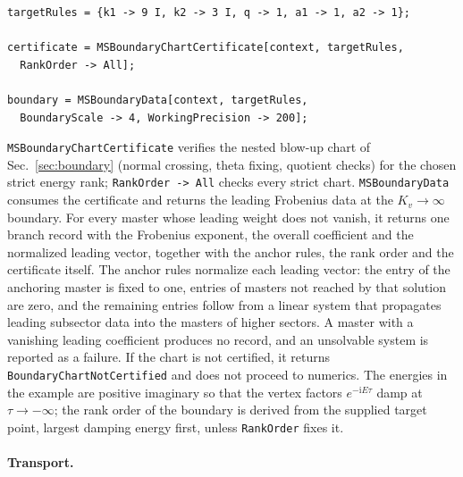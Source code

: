 \documentclass[11pt,a4paper]{article}
\numberwithin{table}{section}
\newcommand{\ii}{\mathrm i}
\begin{document}
\begin{verbatim}
targetRules = {k1 -> 9 I, k2 -> 3 I, q -> 1, a1 -> 1, a2 -> 1};

certificate = MSBoundaryChartCertificate[context, targetRules,
  RankOrder -> All];

boundary = MSBoundaryData[context, targetRules,
  BoundaryScale -> 4, WorkingPrecision -> 200];
\end{verbatim}
\texttt{MSBoundaryChartCertificate} verifies the nested blow-up chart of Sec.~\ref{sec:boundary}
(normal crossing, theta fixing, quotient checks) for the chosen strict energy rank;
\texttt{RankOrder -> All} checks every strict chart. \texttt{MSBoundaryData} consumes the
certificate and returns the leading Frobenius data at the $K_v\to\infty$ boundary. For every master
whose leading weight does not vanish, it returns one branch record with the Frobenius exponent, the
overall coefficient and the normalized leading vector, together with the anchor rules, the rank order
and the certificate itself. The anchor rules normalize each leading vector: the entry of the
anchoring master is fixed to one, entries of masters not reached by that solution are zero, and the
remaining entries follow from a linear system that propagates leading subsector data into the
masters of higher sectors. A master with a vanishing leading coefficient produces no record, and an
unsolvable system is reported as a failure.
If the chart is not certified, it returns \texttt{BoundaryChartNotCertified} and does not proceed
to numerics. The energies in the example are positive imaginary so that the vertex factors
$e^{-\ii E\tau}$ damp at $\tau\to-\infty$; the rank order of the boundary is derived from the
supplied target point, largest damping energy first, unless \texttt{RankOrder} fixes it.

\paragraph{Transport.}
\end{document}
